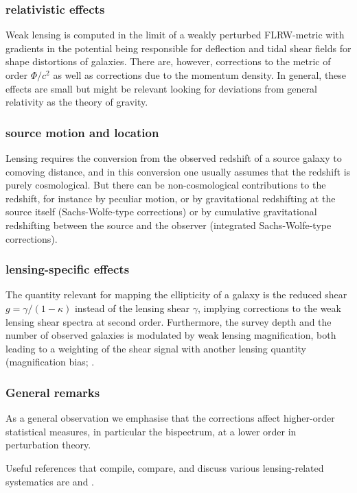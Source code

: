 \subsubsection{relativistic effects}
Weak lensing is computed in the limit of a weakly perturbed FLRW-metric with gradients in the potential being responsible for deflection and tidal shear fields for shape distortions of galaxies. There are, however, corrections to the metric of order $\Phi/c^2$ as well as corrections due to the momentum density. In general, these effects are small but might be relevant looking for deviations from general relativity as the theory of gravity.


\subsubsection{source motion and location}
Lensing requires the conversion from the observed redshift of a source galaxy to comoving distance, and in this conversion one usually assumes that the redshift is purely cosmological. But there can be non-cosmological contributions to the redshift, for instance by peculiar motion, or by gravitational redshifting at the source itself (Sachs-Wolfe-type corrections) or by cumulative gravitational redshifting between the source and the observer (integrated Sachs-Wolfe-type corrections).

\subsubsection{lensing-specific effects}
The quantity relevant for mapping the ellipticity of a galaxy is the reduced shear $g = \gamma/(1-\kappa)$ instead of the lensing shear $\gamma$, implying corrections to the weak lensing shear spectra at second order. Furthermore, the survey depth and the number of observed galaxies is modulated by weak lensing magnification, both leading to a weighting of the shear signal with another lensing quantity (magnification bias; \cite{2001MNRAS.326..326H}.

\subsubsection{General remarks}

As a general observation we emphasise that the corrections affect higher-order statistical measures, in particular the bispectrum, at a lower order in perturbation theory.

Useful references that compile, compare, and discuss various lensing-related systematics are \cite{2010A&A...523A..28K}
and \cite{2010PhRvD..81h3002B}.



